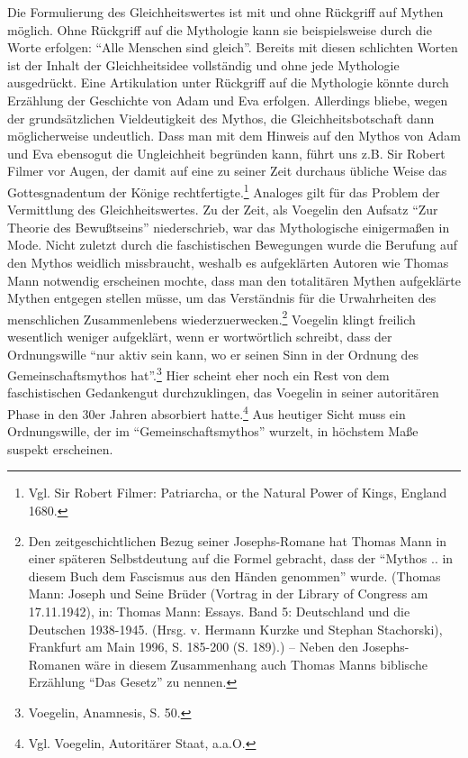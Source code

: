 Die Formulierung des Gleichheitswertes ist mit und ohne Rückgriff auf Mythen
möglich. Ohne Rückgriff auf die Mythologie kann sie beispielsweise durch die
Worte erfolgen: "`Alle Menschen sind gleich"'.  Bereits mit diesen schlichten
Worten ist der Inhalt der Gleichheitsidee vollständig und ohne jede Mythologie
ausgedrückt. Eine Artikulation unter Rückgriff auf die Mythologie könnte durch
Erzählung der Geschichte von Adam und Eva erfolgen. Allerdings bliebe, wegen
der grundsätzlichen Vieldeutigkeit des Mythos, die Gleichheitsbotschaft dann
möglicherweise undeutlich. Dass man mit dem Hinweis auf den Mythos von Adam
und Eva ebensogut die Ungleichheit begründen kann, führt uns z.B. Sir Robert
Filmer vor Augen, der damit auf eine zu seiner Zeit durchaus übliche Weise das
Gottesgnadentum der Könige rechtfertigte.\footnote{Vgl. Sir Robert Filmer:
  Patriarcha, or the Natural Power of Kings, England 1680.} Analoges gilt für
das Problem der Vermittlung des Gleichheitswertes. Zu der Zeit, als Voegelin
den Aufsatz "`Zur Theorie des Bewußtseins"' niederschrieb, war das
Mythologische einigermaßen in Mode. Nicht zuletzt durch die faschistischen
Bewegungen wurde die Berufung auf den Mythos weidlich missbraucht, weshalb es
aufgeklärten Autoren wie Thomas Mann notwendig erscheinen mochte, dass man den
totalitären Mythen aufgeklärte Mythen entgegen stellen müsse, um das
Verständnis für die Urwahrheiten des menschlichen Zusammenlebens
wiederzuerwecken.\footnote{Den zeitgeschichtlichen Bezug seiner Josephs-Romane
  hat Thomas Mann in einer späteren Selbstdeutung auf die Formel gebracht,
  dass der "`Mythos .. in diesem Buch dem Fascismus aus den Händen genommen"'
  wurde.  (Thomas Mann: Joseph und Seine Brüder (Vortrag in der Library of
  Congress am 17.11.1942), in: Thomas Mann: Essays. Band 5: Deutschland und
  die Deutschen 1938-1945.  (Hrsg.  v. Hermann Kurzke und Stephan Stachorski),
  Frankfurt am Main 1996, S. 185-200 (S. 189).) -- Neben den Josephs-Romanen
  wäre in diesem Zusammenhang auch Thomas Manns biblische Erzählung "`Das
  Gesetz"' zu nennen.} Voegelin klingt freilich wesentlich weniger aufgeklärt,
wenn er wortwörtlich schreibt, dass der Ordnungswille "`nur aktiv sein kann,
wo er seinen Sinn in der Ordnung des Gemeinschaftsmythos
hat"'.\footnote{Voegelin, Anamnesis, S. 50.} Hier scheint eher noch ein Rest
von dem faschistischen Gedankengut durchzuklingen, das Voegelin in seiner
autoritären Phase in den 30er Jahren absorbiert hatte.\footnote{Vgl. Voegelin,
  Autoritärer Staat, a.a.O.} Aus heutiger Sicht muss ein Ordnungswille, der im
"`Gemeinschaftsmythos"' wurzelt, in höchstem Maße suspekt erscheinen.

